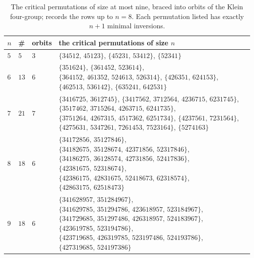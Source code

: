 \documentclass[12pt]{article}
\theoremstyle{definition}
\begin{document}
\begin{table}[htbp]
\centering
\renewcommand{\arraystretch}{1.25}
\begin{tabular}{@{}l@{\quad}l@{\quad}l@{\quad}>{\raggedright\arraybackslash}p{}@{}}
\hline
$n$ & \# & orbits & the critical permutations of size $n$\\
\hline
$5$ & $5$ & $3$ &
   $\{34512,\,45123\}$, $\{45231,\,53412\}$, $\{52341\}$\\
$6$ & $13$ & $6$ &
   $\{351624\}$, $\{361452,\,523614\}$,
   $\{364152,\,461352,\,524613,\,526314\}$, $\{426351,\,624153\}$,
   $\{462513,\,536142\}$, $\{635241,\,642531\}$\\
$7$ & $21$ & $7$ &
   $\{3416725,\,3612745\}$, $\{3417562,\,3712564,\,4236715,\,6231745\}$,
   $\{3517462,\,3715264,\,4263715,\,6241735\}$,
   $\{3751264,\,4267315,\,4517362,\,6251734\}$, $\{4237561,\,7231564\}$,
   $\{4275631,\,5347261,\,7261453,\,7523164\}$, $\{5274163\}$\\
$8$ & $18$ & $6$ &
   $\{34172856,\,35127846\}$,
   $\{34182675,\,35128674,\,42371856,\,52317846\}$,
   $\{34186275,\,36128574,\,42731856,\,52417836\}$,
   $\{42381675,\,52318674\}$,
   $\{42386175,\,42831675,\,52418673,\,62318574\}$,
   $\{42863175,\,62518473\}$\\
$9$ & $18$ & $6$ &
   $\{341628957,\,351284967\}$,
   $\{341629785,\,351294786,\,423618957,\,523184967\}$,
   $\{341729685,\,351297486,\,426318957,\,524183967\}$,
   $\{423619785,\,523194786\}$,
   $\{423719685,\,426319785,\,523197486,\,524193786\}$,
   $\{427319685,\,524197386\}$\\
\hline
\end{tabular}
\caption{The critical permutations of size at most nine, braced into
orbits of the Klein four-group;  records the rows up
to $n = 8$. Each permutation listed has exactly $n+1$ minimal
inversions.}
\label{tab:crit}
\end{table}
\end{document}
